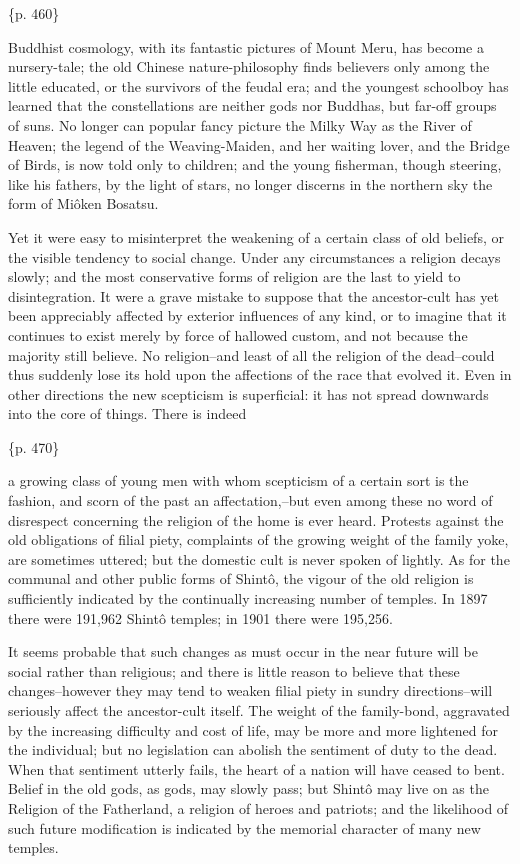 \{p. 460\}

Buddhist cosmology, with its fantastic pictures of Mount Meru, has become a nursery-tale; the old Chinese nature-philosophy finds believers only among the little educated, or the survivors of the feudal era; and the youngest schoolboy has learned that the constellations are neither gods nor Buddhas, but far-off groups of suns. No longer can popular fancy picture the Milky Way as the River of Heaven; the legend of the Weaving-Maiden, and her waiting lover, and the Bridge of Birds, is now told only to children; and the young fisherman, though steering, like his fathers, by the light of stars, no longer discerns in the northern sky the form of Miôken Bosatsu.

Yet it were easy to misinterpret the weakening of a certain class of old beliefs, or the visible tendency to social change. Under any circumstances a religion decays slowly; and the most conservative forms of religion are the last to yield to disintegration. It were a grave mistake to suppose that the ancestor-cult has yet been appreciably affected by exterior influences of any kind, or to imagine that it continues to exist merely by force of hallowed custom, and not because the majority still believe. No religion--and least of all the religion of the dead--could thus suddenly lose its hold upon the affections of the race that evolved it. Even in other directions the new scepticism is superficial: it has not spread downwards into the core of things. There is indeed

\{p. 470\}

a growing class of young men with whom scepticism of a certain sort is the fashion, and scorn of the past an affectation,--but even among these no word of disrespect concerning the religion of the home is ever heard. Protests against the old obligations of filial piety, complaints of the growing weight of the family yoke, are sometimes uttered; but the domestic cult is never spoken of lightly. As for the communal and other public forms of Shintô, the vigour of the old religion is sufficiently indicated by the continually increasing number of temples. In 1897 there were 191,962 Shintô temples; in 1901 there were 195,256.

It seems probable that such changes as must occur in the near future will be social rather than religious; and there is little reason to believe that these changes--however they may tend to weaken filial piety in sundry directions--will seriously affect the ancestor-cult itself. The weight of the family-bond, aggravated by the increasing difficulty and cost of life, may be more and more lightened for the individual; but no legislation can abolish the sentiment of duty to the dead. When that sentiment utterly fails, the heart of a nation will have ceased to bent. Belief in the old gods, as gods, may slowly pass; but Shintô may live on as the Religion of the Fatherland, a religion of heroes and patriots; and the likelihood of such future modification is indicated by the memorial character of many new temples.

